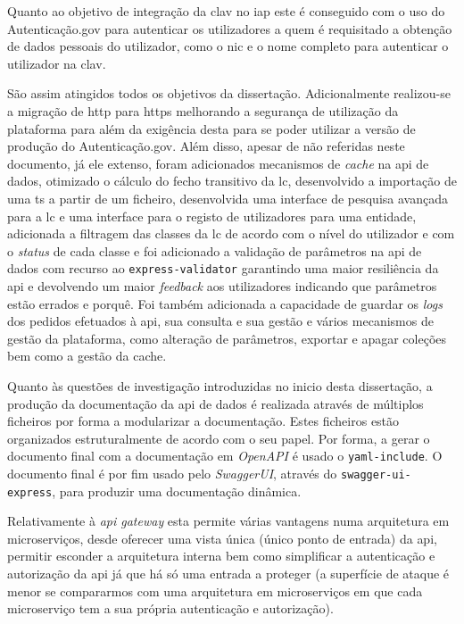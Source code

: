 Quanto ao objetivo de integração da \acrshort{clav} no \acrshort{iap} este é conseguido com o uso do Autenticação.gov para autenticar os utilizadores a quem é requisitado a obtenção de dados pessoais do utilizador, como o \acrshort{nic} e o nome completo para autenticar o utilizador na \acrshort{clav}.

São assim atingidos todos os objetivos da dissertação. Adicionalmente realizou-se a migração de \acrshort{http} para \acrshort{https} melhorando a segurança de utilização da plataforma para além da exigência desta para se poder utilizar a versão de produção do Autenticação.gov. Além disso, apesar de não referidas neste documento, já ele extenso, foram adicionados mecanismos de \textit{cache} na \acrshort{api} de dados, otimizado o cálculo do fecho transitivo da \acrshort{lc}, desenvolvido a importação de uma \acrshort{ts} a partir de um ficheiro, desenvolvida uma interface de pesquisa avançada para a \acrshort{lc} e uma interface para o registo de utilizadores para uma entidade, adicionada a filtragem das classes da \acrshort{lc} de acordo com o nível do utilizador e com o \textit{status} de cada classe e foi adicionado a validação de parâmetros na \acrshort{api} de dados com recurso ao \texttt{express-validator} garantindo uma maior resiliência da \acrshort{api} e devolvendo um maior \textit{feedback} aos utilizadores indicando que parâmetros estão errados e porquê. Foi também adicionada a capacidade de guardar os \textit{logs} dos pedidos efetuados à \acrshort{api}, sua consulta e sua gestão e vários mecanismos de gestão da plataforma, como alteração de parâmetros, exportar e apagar coleções bem como a gestão da cache.

Quanto às questões de investigação introduzidas no inicio desta dissertação, a produção da documentação da \acrshort{api} de dados é realizada através de múltiplos ficheiros por forma a modularizar a documentação. Estes ficheiros estão organizados estruturalmente de acordo com o seu papel. Por forma, a gerar o documento final com a documentação em \textit{OpenAPI} é usado o \texttt{yaml-include}. O documento final é por fim usado pelo \textit{SwaggerUI}, através do \texttt{swagger-ui-express}, para produzir uma documentação dinâmica.

Relativamente à \textit{\acrshort{api} gateway} esta permite várias vantagens numa arquitetura em microserviços, desde oferecer uma vista única (único ponto de entrada) da \acrshort{api}, permitir esconder a arquitetura interna bem como simplificar a autenticação e autorização da \acrshort{api} já que há só uma entrada a proteger (a superfície de ataque é menor se compararmos com uma arquitetura em microserviços em que cada microserviço tem a sua própria autenticação e autorização).


